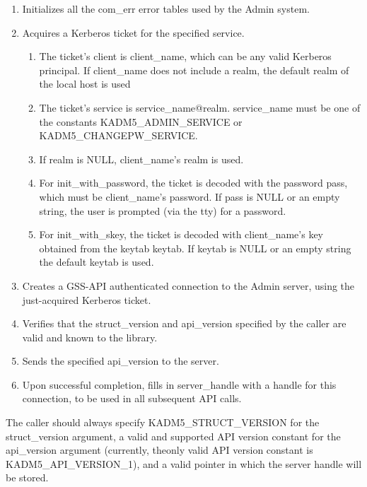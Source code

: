 \begin{enumerate}
\item Initializes all the com_err error tables used by the Admin
system.

\item Acquires a Kerberos ticket for the specified service.

\begin{enumerate}
\item The ticket's client is client_name, which can be any valid
Kerberos principal.  If client_name does not include a realm, the
default realm of the local host is used
\item The ticket's service is service_name@realm.  service_name must
be one of the constants KADM5_ADMIN_SERVICE or
KADM5_CHANGEPW_SERVICE.
\item If realm is NULL, client_name's realm is used.

\item For init_with_password, the ticket is decoded with the password
pass, which must be client_name's password.  If pass is NULL or an
empty string, the user is prompted (via the tty) for a password.

\item For init_with_skey, the ticket is decoded with client_name's key
obtained from the keytab keytab.  If keytab is NULL or an empty string
the default keytab is used.
\end{enumerate}

\item Creates a GSS-API authenticated connection to the Admin server,
using the just-acquired Kerberos ticket.

\item Verifies that the struct_version and api_version specified by
the caller are valid and known to the library.

\item Sends the specified api_version to the server.

\item Upon successful completion, fills in server_handle with a handle
for this connection, to be used in all subsequent API calls.
\end{enumerate}

The caller should always specify KADM5_STRUCT_VERSION for the
struct_version argument, a valid and supported API version constant
for the api_version argument (currently, theonly valid API version
constant is KADM5_API_VERSION_1), and a valid pointer in which
the server handle will be stored.

